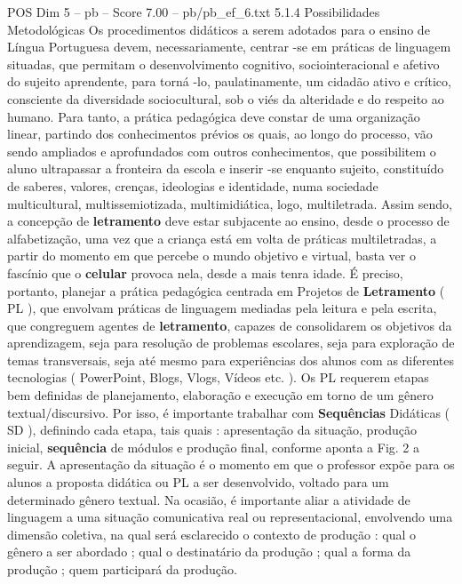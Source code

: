 \begin{textsample}{POS Dim 5 – pb – Score 7.00 – pb/pb\_ef\_6.txt}  \label{ex:f5_pos_097}
5.1.4 Possibilidades Metodológicas Os procedimentos didáticos a serem adotados para o ensino de Língua Portuguesa devem, necessariamente, centrar -se em práticas de linguagem situadas, que permitam o desenvolvimento cognitivo, sociointeracional e afetivo do sujeito aprendente, para torná -lo, paulatinamente, um cidadão ativo e crítico, consciente da diversidade sociocultural, sob o viés da alteridade e do respeito ao humano.
Para tanto, a prática pedagógica deve constar de uma organização linear, partindo dos conhecimentos prévios os quais, ao longo do processo, vão sendo ampliados e aprofundados com outros conhecimentos, que possibilitem o aluno ultrapassar a fronteira da escola e inserir -se enquanto sujeito, constituído de saberes, valores, crenças, ideologias e identidade, numa sociedade multicultural, multissemiotizada, multimidiática, logo, multiletrada.
Assim sendo, a concepção de \textbf{letramento} deve estar subjacente ao ensino, desde o processo de alfabetização, uma vez que a criança está em volta de práticas multiletradas, a partir do momento em que percebe o mundo objetivo e virtual, basta ver o fascínio que o \textbf{celular} provoca nela, desde a mais tenra idade.
É preciso, portanto, planejar a prática pedagógica centrada em Projetos de \textbf{Letramento} ( PL ), que envolvam práticas de linguagem mediadas pela leitura e pela escrita, que congreguem agentes de \textbf{letramento}, capazes de consolidarem os objetivos da aprendizagem, seja para resolução de problemas escolares, seja para exploração de temas transversais, seja até mesmo para experiências dos alunos com as diferentes tecnologias ( PowerPoint, Blogs, Vlogs, Vídeos etc. ).
Os PL requerem etapas bem definidas de planejamento, elaboração e execução em torno de um gênero textual/discursivo.
Por isso, é importante trabalhar com \textbf{Sequências} Didáticas ( SD ), definindo cada etapa, tais quais : apresentação da situação, produção inicial, \textbf{sequência} de módulos e produção final, conforme aponta a Fig. 2 a seguir.
A apresentação da situação é o momento em que o professor expõe para os alunos a proposta didática ou PL a ser desenvolvido, voltado para um determinado gênero textual.
Na ocasião, é importante aliar a atividade de linguagem a uma situação comunicativa real ou representacional, envolvendo uma dimensão coletiva, na qual será esclarecido o contexto de produção : qual o gênero a ser abordado ; qual o destinatário da produção ; qual a forma da produção ; quem participará da produção.

\end{textsample}
